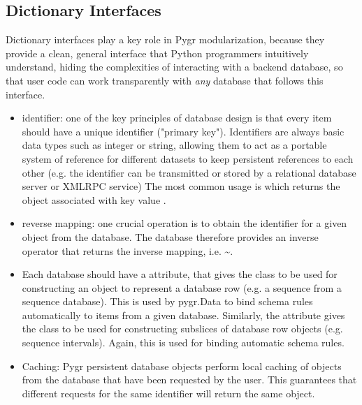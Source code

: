 \documentclass{howto}
\begin{document}
\subsection{Dictionary Interfaces}
Dictionary interfaces play a key role in Pygr modularization, because they
provide a clean, general interface that Python programmers intuitively
understand, hiding the complexities of interacting with a backend database,
so that user code can work transparently with {\em any} database that
follows this interface.
\begin{itemize}
\item identifier: one of the key principles of database
design is that every item should have a unique identifier ("primary key").
Identifiers are always basic data types such as integer or string, allowing
them to act as a portable system of reference for different datasets to keep
persistent references to each other (e.g. the identifier can be transmitted  
or stored by a relational database server or XMLRPC service)
The most common usage is  which returns the object associated
with key value .

\item reverse mapping: one crucial operation is to obtain the identifier for
a given object from the database.  The database therefore provides an
inverse operator that returns the inverse mapping, i.e. 
\textasciitilde{}.

\item Each database should have a  attribute, that 
gives the class to be used for constructing an object to represent a 
database row (e.g. a sequence from a sequence database).  
This is used by pygr.Data to bind schema rules automatically
to items from a given database.  Similarly, the  attribute
gives the class to be used for constructing subslices of database row 
objects (e.g. sequence intervals).  Again, this is used for binding automatic
schema rules.

\item Caching: Pygr persistent database objects perform local caching of objects
from the database that have been requested by the user.  This guarantees that
different requests for the same identifier will return the same object.


\end{itemize}
\end{document}
